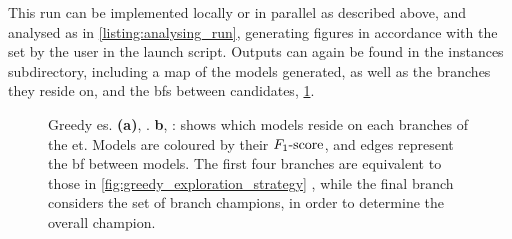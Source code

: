 This \gls{run} can be implemented locally or in parallel as described above\footnotemark,
    and analysed as in \cref{listing:analysing_run},
    generating figures in accordance with the  set by the user in the launch script. 
Outputs can again be found in the \glspl{instance} subdirectory, including a map of the models generated, 
    as well as the branches they reside on, and the \glspl{bf} between candidates, \cref{fig:example_es_greedy}. 

\begin{figure}[H]
    \begin{center}
    \qquad
    \end{center}
    \caption[Greedy exploration strategy]{
        Greedy \acrlong{es}. 
        \textbf{(a)}, . 
        \textbf{b}, : shows which models reside on each branches of the \acrlong{et}. 
        Models are coloured by their $ F_{1}\text{-score} $, and edges represent the \gls{bf} between models. 
        The first four branches are equivalent to those in \cref{fig:greedy_exploration_strategy} ,
        while the final branch considers the set of branch champions, in order to determine the overall champion. 
    }
    \label{fig:example_es_greedy}
\end{figure}


